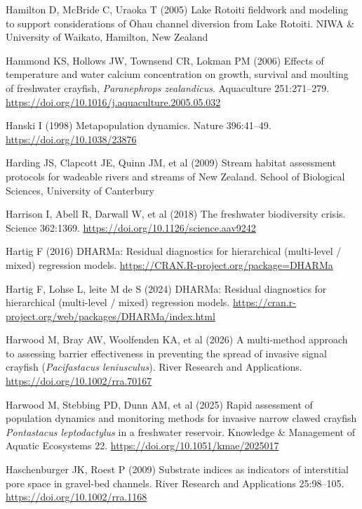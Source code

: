 \documentclass[
  12pt,
  a4paper,
  oneside]{scrbook}
\newlength{\cslhangindent}
\newenvironment{CSLReferences}[2] %
 {\begin{list}{}{%
  \setlength{\itemindent}{0pt}
  \setlength{\leftmargin}{0pt}
  \setlength{\parsep}{0pt}
  \ifodd #1
   \setlength{\leftmargin}{\cslhangindent}
   \setlength{\itemindent}{-1\cslhangindent}
  \fi
  \setlength{\itemsep}{#2\baselineskip}}}
 {\end{list}}
\renewenvironment{CSLReferences}[2]
   {\begin{list}{}{%
    \setlength{\itemindent}{0pt}
    \setlength{\leftmargin}{0pt}
    \setlength{\parsep}{0pt}
    \ifodd #1
     \setlength{\leftmargin}{\cslhangindent}
     \setlength{\itemindent}{-1\cslhangindent}
    \fi
    \setlength{\itemsep}{0.3\baselineskip}}}
   {\end{list}}%
\begin{document}
\begin{CSLReferences}{1}{1}
Hamilton D, McBride C, Uraoka T (2005) {Lake Rotoiti} fieldwork and
modeling to support considerations of {Ōhau} channel diversion from
{Lake Rotoiti}. NIWA \& University of Waikato, Hamilton, New Zealand

Hammond KS, Hollows JW, Townsend CR, Lokman PM (2006) Effects of
temperature and water calcium concentration on growth, survival and
moulting of freshwater crayfish, {\emph{Paranephrops zealandicus}}.
Aquaculture 251:271--279.
\url{https://doi.org/10.1016/j.aquaculture.2005.05.032}

Hanski I (1998) Metapopulation dynamics. Nature 396:41--49.
\url{https://doi.org/10.1038/23876}

Harding JS, Clapcott JE, Quinn JM, et al (2009) Stream habitat
assessment protocols for wadeable rivers and streams of {New Zealand}.
School of Biological Sciences, University of Canterbury

Harrison I, Abell R, Darwall W, et al (2018) The freshwater biodiversity
crisis. Science 362:1369. \url{https://doi.org/10.1126/science.aav9242}

Hartig F (2016) {DHARMa}: Residual diagnostics for hierarchical
(multi-level / mixed) regression models.
\url{https://CRAN.R-project.org/package=DHARMa}

{Hartig F, Lohse L, leite M de S} (2024) {DHARMa}: Residual diagnostics
for hierarchical (multi-level / mixed) regression models.
\url{https://cran.r-project.org/web/packages/DHARMa/index.html}

Harwood M, Bray AW, Woolfenden KA, et al (2026) A multi‐method approach
to assessing barrier effectiveness in preventing the spread of invasive
signal crayfish ({\emph{Pacifastacus leniusculus}}). River Research and
Applications. \url{https://doi.org/10.1002/rra.70167}

Harwood M, Stebbing PD, Dunn AM, et al (2025) Rapid assessment of
population dynamics and monitoring methods for invasive narrow clawed
crayfish {\emph{Pontastacus leptodactylus}} in a freshwater reservoir.
Knowledge \& Management of Aquatic Ecosystems 22.
\url{https://doi.org/10.1051/kmae/2025017}

Haschenburger JK, Roest P (2009) Substrate indices as indicators of
interstitial pore space in gravel-bed channels. River Research and
Applications 25:98--105. \url{https://doi.org/10.1002/rra.1168}


\end{CSLReferences}
\end{document}
